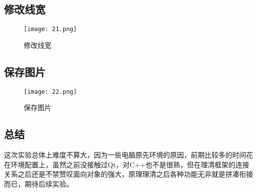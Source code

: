 \documentclass[14pt]{scrartcl} %
\begin{document}
\pagebreak
\subsection{修改线宽}

\begin{figure}[h] %
	\centering
	\texttt{[image: 21.png]} %
	\caption{修改线宽}
\end{figure}

\subsection{保存图片}

\begin{figure}[h] %
	\centering
	\texttt{[image: 22.png]} %
	\caption{保存图片}
\end{figure}

\pagebreak
\subsection{总结}

这次实验总体上难度不算大，因为一些电脑原先环境的原因，前期比较多的时间花在环境配置上，虽然之前没接触过Qt，对C++也不是很熟，但在理清框架的连接关系之后还是不禁赞叹面向对象的强大，原理理清之后各种功能无非就是拼凑衔接而已，期待后续实验。
\end{document}
